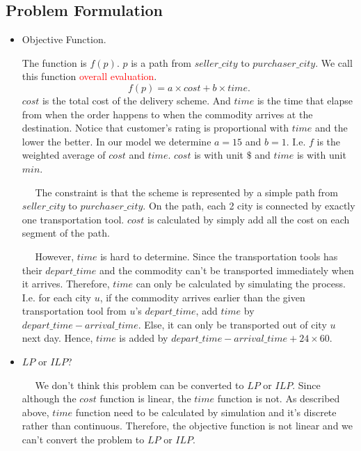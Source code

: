 \documentclass[11pt, a4paper]{article} %
\begin{document}
	\subsection{Problem Formulation}\label{1-PF}
	\begin{itemize}
		\item Objective Function.\par
		The function is $f(p)$. $p$ is a path from $seller\_city$ to $purchaser\_city$. We call this function \textcolor{red}{overall evaluation}.
		$$f(p) = a\times cost+b\times time.$$
		$cost$ is the total cost of the delivery scheme. And  $time$ is the time that elapse from when the order happens to when the commodity arrives at the destination. Notice that customer's rating is proportional with $time$ and the lower the better. In our model we determine $a=15$ and $b=1$. I.e. $f$ is the weighted average of $cost$ and $time$. $cost$ is with unit $\$$ and $time$ is with unit $min$.\par
		$\quad$ The constraint is that the scheme is represented by a simple path from $seller\_city$ to $purchaser\_city$. On the path, each 2 city is connected by exactly one transportation tool. $cost$ is calculated by simply add all the cost on each segment of the path.\par
		$\quad$ However, $time$ is hard to determine. Since the transportation tools has their $depart\_time$ and the commodity can't be transported immediately when it arrives. Therefore, $time$ can only be calculated by simulating the process. I.e. for each city $u$, if the commodity arrives earlier than the given transportation tool from $u$'s $depart\_time$, add $time$ by $depart\_time-arrival\_time$. Else, it can only be transported out of city $u$ next day. Hence, $time$ is added by $depart\_time-arrival\_time+24\times 60$.\\
		\item $LP$ or $ILP$?\par
		$\quad$ We don't think this problem can be converted to $LP$ or $ILP$. Since although the $cost$ function is linear, the $time$ function is not. As described above, $time$ function need to be calculated by simulation and it's discrete rather than continuous. Therefore, the objective function is not linear and we can't convert the problem to $LP$ or $ILP$.
	\end{itemize}
	
\end{document}
